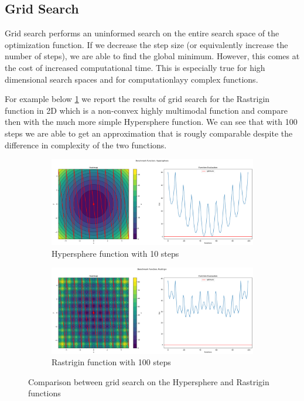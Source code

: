 \subsection{Grid Search}
\label{sec:grid-search}

Grid search performs an uninformed search on the entire search space of the optimization function. If we decrease the step size (or equivalently increase the number of steps), we are able to find the global minimum. However, this comes at the cost of increased computational time. This is especially true for high dimensional search spaces and for computationlayy complex functions.

For example below \ref{fig:gs-100} we report the results of grid search for the Rastrigin function in 2D which is a non-convex highly multimodal function and compare then with the much more simple Hypersphere function. We can see that with 100 steps we are able to get an approximation that is rougly comparable despite the difference in complexity of the two functions.
\begin{figure}[H]
    \begin{subfigure}{0.5\textwidth}
        \includegraphics[width=\textwidth]{lab1/imgs/gs_sphere_100.png}
        \caption{Hypersphere function with 10 steps}
    \end{subfigure}
    \begin{subfigure}{0.5\textwidth}
        \includegraphics[width=\textwidth]{lab1/imgs/gs_rastrigin_100.png}
        \caption{Rastrigin function with 100 steps}
    \end{subfigure}
    \caption{Comparison between grid search on the Hypersphere and Rastrigin functions}
    \label{fig:gs-100}
\end{figure}


